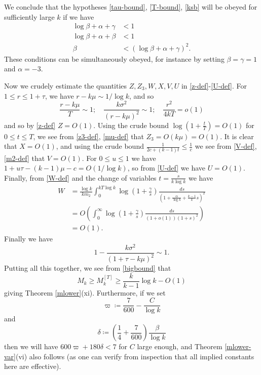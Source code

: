 We conclude that the hypotheses \eqref{tau-bound}, \eqref{T-bound}, \eqref{ksb} will be obeyed for sufficiently large $k$ if we have
\begin{align*}
\log \beta + \alpha + \gamma &< 1 \\
\log \beta + \alpha + \beta &< 1 \\
\beta &< (\log \beta + \alpha + \gamma)^2.
\end{align*}
These conditions can be simultaneously obeyed, for instance by setting $\beta=\gamma=1$ and $\alpha = -3$.

Now we crudely estimate the quantities $Z,Z_3,W,X,V,U$ in \eqref{z-def}-\eqref{U-def}.  For $1 \leq r \leq 1+\tau$, we have $r-k\mu \sim 1/\log k$, and so
$$ \frac{r-k\mu}{T} \sim 1; \quad \frac{k \sigma^2}{(r-k\mu)^2} \sim 1; \quad \frac{r^2}{4kT} = o(1)$$
and so by \eqref{z-def} $Z = O(1)$.  Using the crude bound $\log(1+\frac{t}{T}) = O(1)$ for $0 \leq t \leq T$, we see from \eqref{z3-def}, \eqref{mu-def} that $Z_3 = O( k \mu ) = O(1)$.  It is clear that $X = O(1)$, and using the crude bound $\frac{1}{2c+(k-1)t} \leq \frac{1}{c}$ we see from \eqref{V-def}, \eqref{m2-def} that $V = O(1)$.  For $0 \leq u \leq 1$ we have $1 + u\tau - (k-1)\mu - c = O(1/\log k)$, so from \eqref{U-def} we have $U=O(1)$.  Finally, from \eqref{W-def} and the change of variables $t = \frac{s}{k \log k}$ we have
\begin{align*}
W &= \frac{\log k}{k m_2} \int_0^{kT\log k} \log\left(1 + \frac{\gamma}{s}\right) \frac{ds}{(1 + \frac{\alpha}{\log k} + \frac{k-1}{k} s)^2} \\
&= O\left( \int_0^\infty \log\left(1+\frac{\gamma}{s}\right) \frac{ds}{(1+o(1))(1+s)^2} \right) \\
&= O(1).
\end{align*}
Finally we have
$$ 1 - \frac{k\sigma^2}{(1+\tau-k\mu)^2} \sim 1.$$
Putting all this together, we see from \eqref{bigbound} that
$$  M_k \geq M_k^{[T]} \geq \frac{k}{k-1} \log k -  O(1)$$
giving Theorem \ref{mlower}(xi).  Furthermore, if we set
$$ \varpi \coloneqq \frac{7}{600} - \frac{C}{\log k}$$
and
$$ \delta \coloneqq \left(\frac{1}{4} + \frac{7}{600}\right) \frac{\beta}{\log k}$$
then we will have $600 \varpi + 180 \delta < 7$ for $C$ large enough, and Theorem \ref{mlower-var}(vi) also follows (as one can verify from inspection that all implied constants here are effective).


